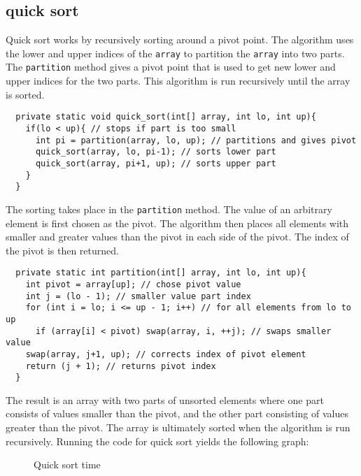 \documentclass[a4paper,11pt]{article}
\begin{document}
\subsection*{quick sort}

Quick sort works by recursively sorting around a pivot point. The 
algorithm uses the lower and upper indices of the {\tt array} to partition
the {\tt array} into two parts. The {\tt partition} method gives a pivot 
point that is used to get new lower and upper indices for the two parts.
This algorithm is run recursively until the array is sorted.

\begin{verbatim}
  private static void quick_sort(int[] array, int lo, int up){
    if(lo < up){ // stops if part is too small
      int pi = partition(array, lo, up); // partitions and gives pivot
      quick_sort(array, lo, pi-1); // sorts lower part
      quick_sort(array, pi+1, up); // sorts upper part
    }
  }
\end{verbatim}

The sorting takes place in the {\tt partition} method. The value of an 
arbitrary element is first chosen as the pivot. The algorithm then places 
all elements with smaller and greater values than the pivot in each side 
of the pivot. The index of the pivot is then returned.

\begin{verbatim}
  private static int partition(int[] array, int lo, int up){
    int pivot = array[up]; // chose pivot value
    int j = (lo - 1); // smaller value part index
    for (int i = lo; i <= up - 1; i++) // for all elements from lo to up
      if (array[i] < pivot) swap(array, i, ++j); // swaps smaller value 
    swap(array, j+1, up); // corrects index of pivot element
    return (j + 1); // returns pivot index
  }
\end{verbatim}

The result is an array with two parts of unsorted elements where one part
consists of values smaller than the pivot, and the other part consisting 
of values greater than the pivot. The array is ultimately sorted when
the algorithm is run recursively. Running the code for quick sort yields
the following graph:

\begin{figure}[h]
  \centering
  \caption{Quick sort time}
  \label{fig:plot6}
\end{figure}
\end{document}
